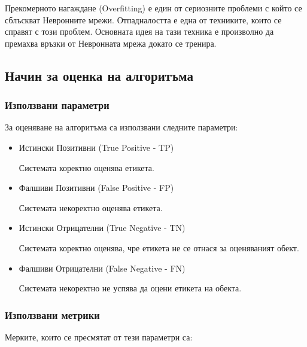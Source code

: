 \documentclass{article}
\begin{document}
    Прекомерното нагаждане (Overfitting) е един от сериозните проблеми с който се сблъскват Невронните мрежи. Отпадналостта
    е една от техниките, които се справят с този проблем. Основната идея на тази техника е произволно да премахва връзки от
    Невронната мрежа докато се тренира. \cite{dropout}

    \subsection{Начин за оценка на алгоритъма}

    \subsubsection{Използвани параметри}

    За оценяване на алгоритъма са използвани следните параметри:

    \begin{itemize}

        \item Истински Позитивни (True Positive - TP)

        Системата коректно оценява етикета.

        \item Фалшиви Позитивни (False Positive - FP)

        Системата некоректно оценява етикета.

        \item Истински Отрицателни (True Negative - TN)

        Системата коректно оценява, чре етикета не се отнася за оценяваният обект.

        \item Фалшиви Отрицателни (False Negative - FN)

        Системата некоректно не успява да оцени етикета на обекта. \cite{intro-to-nlp-mit}

    \end{itemize}

    \subsubsection{Използвани метрики}

    Мерките, които се пресмятат от тези параметри са:
\end{document}
